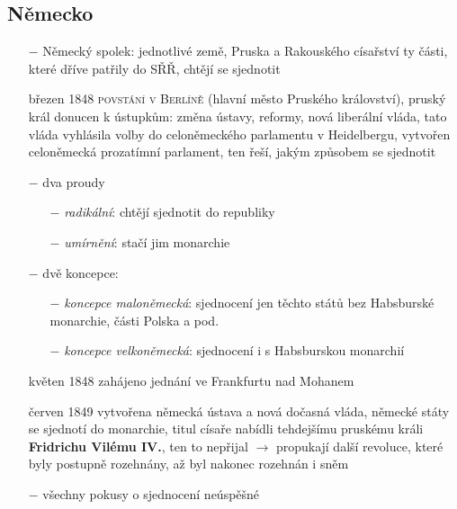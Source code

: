 \documentclass{article}
\begin{document}
\subsection*{Německo}
\begin{itemize}
    \vspace{-0.5em}
    \setlength\itemsep{0.15em}
    \item[$-$] Německý spolek: jednotlivé země, Pruska a Rakouského císařství ty části, které dříve patřily do SŘŘ, chtějí se sjednotit
    \item[březen 1848] \textsc{povstání v Berlíně} (hlavní město Pruského království), pruský král donucen k ústupkům: změna ústavy, reformy, nová liberální vláda, tato vláda vyhlásila volby do celoněmeckého parlamentu v Heidelbergu, vytvořen celoněmecká prozatímní parlament, ten řeší, jakým způsobem se sjednotit
    \item[$-$] dva proudy
    \begin{itemize}
        \vspace{-0.5em}
        \setlength\itemsep{0.15em}
        \item[$-$] \textit{radikální}: chtějí sjednotit do republiky
        \item[$-$] \textit{umírnění}: stačí jim monarchie

    \end{itemize}
    \item[$-$] dvě koncepce:
    \begin{itemize}
        \vspace{-0.5em}
        \setlength\itemsep{0.15em}
        \item[$-$] \textit{koncepce maloněmecká}: sjednocení jen těchto států bez Habsburské monarchie, části Polska a pod.
        \item[$-$] \textit{koncepce velkoněmecká}: sjednocení i s Habsburskou monarchií
    \end{itemize}
    \item[květen 1848] zahájeno jednání ve Frankfurtu nad Mohanem
    \item[červen 1849] vytvořena německá ústava a nová dočasná vláda, německé státy se sjednotí do monarchie, titul císaře nabídli tehdejšímu pruskému králi \textbf{Fridrichu Vilému IV.}, ten to nepřijal $\rightarrow$ propukají další revoluce, které byly postupně rozehnány, až byl nakonec rozehnán i sněm
    \item[$-$] všechny pokusy o sjednocení neúspěšné
\end{itemize}
\end{document}
